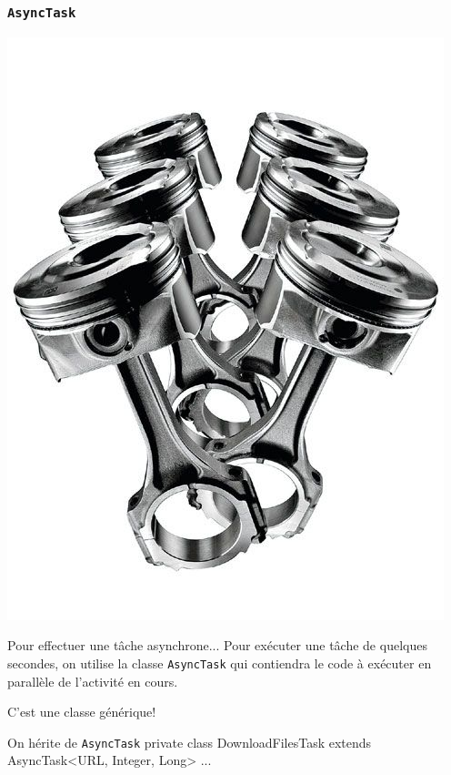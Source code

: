 \documentclass{beamer}
\begin{document}
\begin{frame}
\frametitle{\verb!AsyncTask!}
\begin{center}
\includegraphics[scale=0.07]{async.jpg}
\end{center}
\begin{block}{Pour effectuer une tâche asynchrone...}
Pour exécuter une tâche de quelques secondes, on utilise la classe \verb!AsyncTask! qui contiendra le code à exécuter en parallèle de l'activité en cours.
\end{block}
\pause
\begin{block}{}
C'est une classe générique!
\end{block}
\pause
\begin{exampleblock}{On hérite de \verb!AsyncTask!}
 private class DownloadFilesTask extends AsyncTask<URL, Integer, Long> { ... }
\end{exampleblock}
\end{frame}
\end{document}
